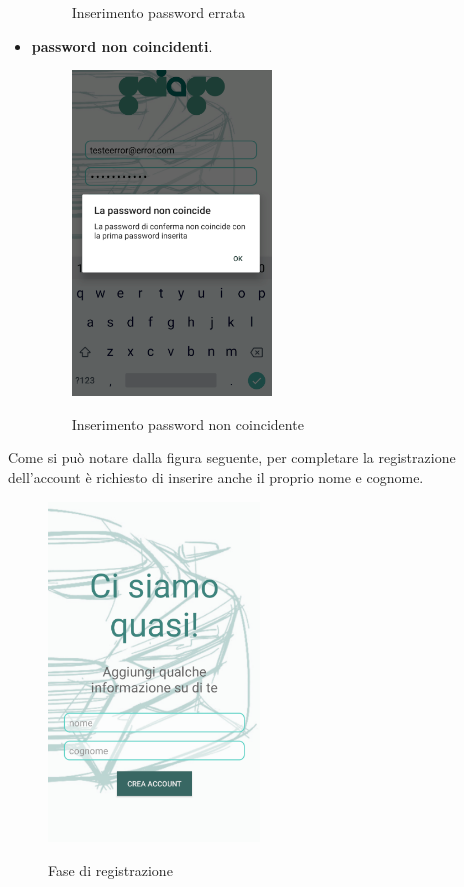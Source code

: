 \begin{itemize}
\begin{figure}[H]
		\caption{Inserimento password errata}
		\label{error_psw}
	\end{figure}
\pagebreak
	\item \textbf{password non coincidenti}.
	\begin{figure}[H] 
		\centering 
		\includegraphics[width=0.5\textwidth]{res/images/errore_psw_diverse.png}\\
		\caption{Inserimento password non coincidente}
		\label{error_psw2}
	\end{figure}
\pagebreak
\end{itemize} 

\pagebreak
 Come si può notare dalla figura seguente, per completare la registrazione dell'account è richiesto di inserire anche il proprio nome e cognome.
 \begin{figure}[H] 
	\centering 
	\includegraphics[width=0.5\textwidth]{res/images/registrazione2.png}\\
	\caption{Fase di registrazione}
	\label{registrazione2}
\end{figure}

